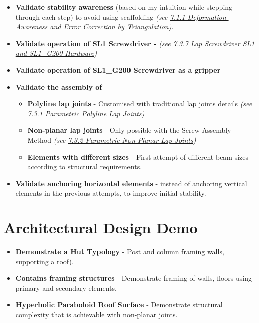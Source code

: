 \documentclass[11pt]{book}
\begin{document}
\begin{itemize}
	\item \textbf{Validate stability awareness} (based on my intuition while stepping through each step) to avoid using scaffolding \textit{(see \uline{7.1.1 Deformation-Awareness and Error Correction by Triangulation})}.

	\item \textbf{Validate operation of SL1 Screwdriver - }\textit{(see \uline{7.3.7 Lap Screwdriver SL1 and SL1\_G200 Hardware})}

	\item \textbf{Validate operation of SL1\_G200 Screwdriver as a gripper}

	\item \textbf{Validate the assembly of}

\begin{itemize}
	\item \textbf{Polyline lap joints} - Customised with traditional lap joints details \textit{(see \uline{7.3.1 Parametric Polyline Lap Joints})}

	\item \textbf{Non-planar lap joints }- Only possible with the Screw Assembly Method \textit{(see \uline{7.3.2 Parametric Non-Planar Lap Joints})}

	\item \textbf{Elements with different sizes} - First attempt of different beam sizes according to structural requirements. 

\end{itemize}
	\item \textbf{Validate anchoring horizontal elements} - instead of anchoring vertical elements in the previous attempts, to improve initial stability.

\end{itemize}
\section{Architectural Design Demo}

\begin{itemize}
	\item \textbf{Demonstrate a Hut Typology} - Post and column framing walls, supporting a roof).

	\item \textbf{Contains framing structures} - Demonstrate framing of walls, floors using primary and secondary elements.

	\item \textbf{Hyperbolic Paraboloid Roof Surface} - Demonstrate structural complexity that is achievable with non-planar joints. 

\end{itemize}
\end{document}
